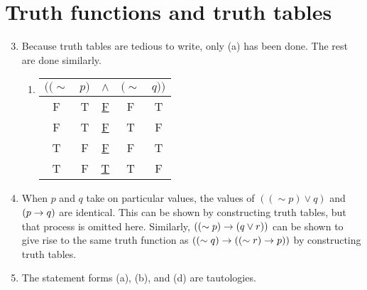\section{Truth functions and truth tables}

\solutions{}

\begin{enumerate}
  \setcounter{enumi}{2}
  \item %
    Because truth tables are tedious to write, only (a) has been done. The rest are done similarly.
    \begin{enumerate}[(\alph*)]
      \item
        \begin{tabular}{ccccc}
          \(((\sim\)&
          \(p)\)&
          \(\wedge\)&
          \((\sim\)&
          \(q))\)\\\hline

          F&
          T&
          \underline{F}&
          F&
          T\\

          F&
          T&
          \underline{F}&
          T&
          F\\

          T&
          F&
          \underline{F}&
          F&
          T\\

          T&
          F&
          \underline{T}&
          T&
          F
        \end{tabular}

    \end{enumerate}

  \item %
    When \(p\) and \(q\) take on particular values, the values of \(((\sim p) \lor q)\) and \((p \rightarrow q)\) are identical. This can be shown by constructing truth tables, but that process is omitted here. Similarly, \(((\sim p) \rightarrow (q \lor r))\) can be shown to give rise to the same truth function as \(((\sim q) \rightarrow ((\sim r) \rightarrow p))\) by constructing truth tables.

  \item %
    The statement forms (a), (b), and (d) are tautologies.


\end{enumerate}

